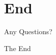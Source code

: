 \section{End}

\begin{frame}
	\Huge{\centerline{Any Questions?}}
\end{frame}

\begin{frame}
	\Huge{\centerline{The End}}
\end{frame}
